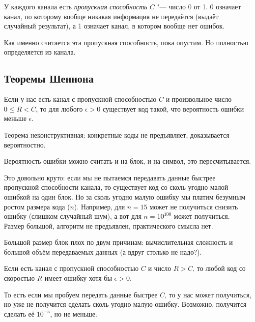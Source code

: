 \begin{Def}
	У каждого канала есть \textit{пропускная способность $C$} "--- число 0 от 1.
	0 означает канал, по которому вообще никакая информация не передаётся (выдаёт случайный результат),
	а 1 означает канал, в котором вообще нет ошибок.
\end{Def}
\begin{Rem}
	Как именно считается эта пропускная способность, пока опустим.
	Но полностью определяется из канала.
\end{Rem}

\subsection{Теоремы Шеннона}
\begin{theorem}
	Если у нас есть канал с пропускной способностью $C$ и произвольное число $0 \le R < C$,
	то для любого $\epsilon > 0$ существует код такой, что
	вероятность ошибки меньше $\epsilon$.
\end{theorem}
\begin{Rem}
	Теорема неконструктивная: конкретные коды не предъявляет, доказывается вероятностно.
\end{Rem}
\begin{Rem}
	Вероятность ошибки можно считать и на блок, и на символ, это пересчитывается.
\end{Rem}
\begin{Rem}
	Это довольно круто: если мы не пытаемся передавать данные быстрее пропускной способности канала,
	то существует код со сколь угодно малой ошибкой на один блок.
	Но за сколь угодно малую ошибку мы платим безумным ростом размера кода ($n$).
	Например, для $n=15$ может не получиться снизить ошибку (слишком случайный шум),
	а вот для $n=10^{100}$ может получиться.
	Размер большой, алгоритм не предъявлен, практического смысла нет.
\end{Rem}
\begin{Rem}
	Большой размер блок плох по двум причинам: вычислительная сложность и большой объём передаваемых данных (а вдруг столько не надо?).
\end{Rem}
\begin{theorem}
	Если есть канал с пропускной способностью $C$ и число $R>C$,
	то любой код со скоростью $R$ имеет ошибку хотя бы $\epsilon >0 $.
\end{theorem}
\begin{Rem}
	То есть если мы пробуем передать данные быстрее $C$, то у нас может получиться,
	но уже не получится сделать сколь угодно малую ошибку.
	Возможно, получится сделать её $10^{-5}$, но не меньше.
\end{Rem}

